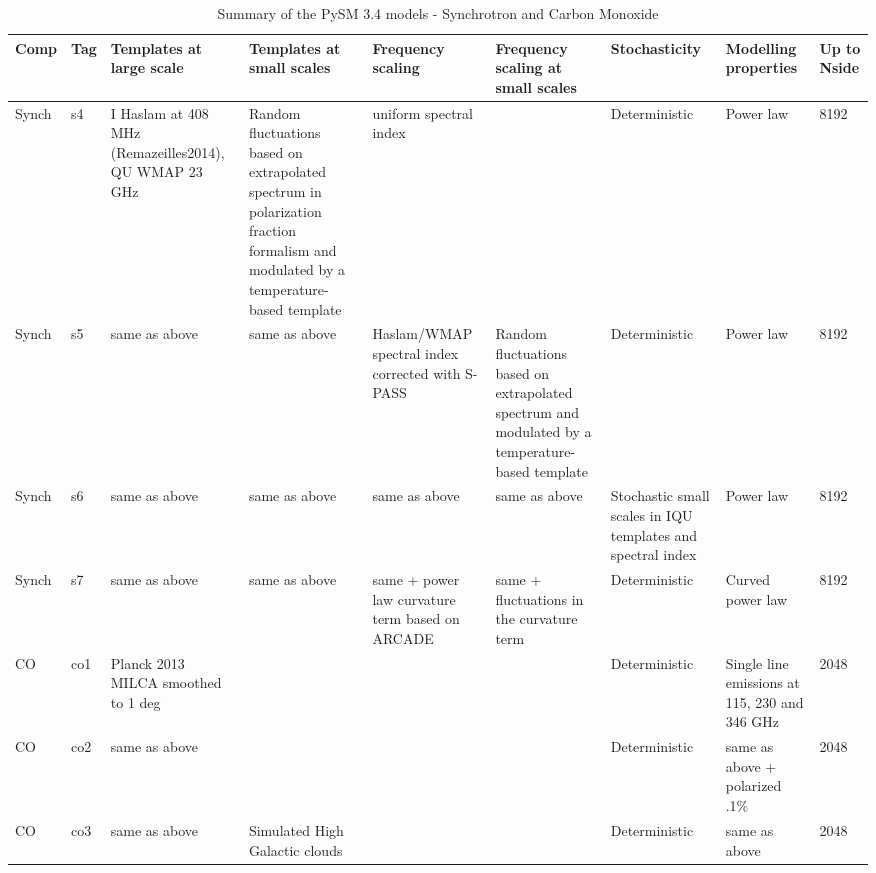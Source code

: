 \documentclass[twocolumn]{aastex631}
\begin{document}
\begin{table}[t]
\caption{Summary of the PySM 3.4 models - Synchrotron and Carbon Monoxide}
\begin{center}
\begin{tabular}{ | m{1cm} | m{0.5cm}| m{2cm} | m{2.2cm} | m{2cm}| m{2.2cm} | m{2cm} | m{2cm}| m{.7cm} | } 

  \toprule
Comp & Tag & Templates at large scale & Templates at small scales & Frequency scaling & Frequency scaling at small scales & Stochasticity & Modelling properties & Up to Nside \\
\midrule
Synch & s4 & I Haslam at 408 MHz (Remazeilles2014), QU WMAP 23 GHz & Random fluctuations based on extrapolated spectrum in polarization fraction formalism and modulated by a temperature-based template & uniform spectral index &  & Deterministic & Power law & 8192 \\
\hline

Synch & s5 & same as above & same as above & Haslam/WMAP spectral index corrected with S-PASS & Random fluctuations based on extrapolated spectrum and modulated by a temperature-based template & Deterministic & Power law & 8192 \\
\hline

Synch & s6 & same as above & same as above & same as above & same as above & Stochastic small scales in IQU templates and spectral index & Power law & 8192 \\
\hline

Synch & s7 & same as above & same as above & same + power law curvature term based on ARCADE & same + fluctuations in the curvature term & Deterministic & Curved power law & 8192 \\
\hline

CO & co1 & Planck 2013 MILCA smoothed to 1 deg &  &  &  & Deterministic & Single line emissions at 115, 230 and 346 GHz & 2048 \\
\hline

CO & co2 & same as above &  &  &  & Deterministic & same as above + polarized .1\% & 2048 \\
\hline

CO & co3 & same as above & Simulated High Galactic clouds &  &  & Deterministic & same as above & 2048 \\
\bottomrule
\end{tabular}
\end{center}
\label{table:summarysynchroco}
\end{table}
\end{document}
